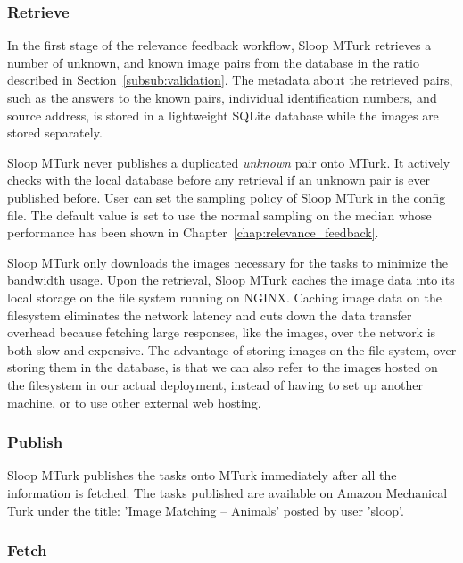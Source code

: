 \subsubsection{Retrieve}

In the first stage of the relevance feedback workflow, Sloop MTurk retrieves a
number of unknown, and known image pairs from the database in the ratio
described in Section~\ref{subsub:validation}. The metadata about the retrieved pairs,
such as the answers to the known pairs, individual identification numbers, and
source address, is stored in a lightweight SQLite database while the images are
stored separately.

Sloop MTurk never publishes a duplicated \emph{unknown} pair onto MTurk. It
actively checks with the local database before any retrieval if an unknown pair
is ever published before. User can set the sampling policy of Sloop MTurk in
the config file. The default value is set to use the normal sampling on the
median whose performance has been shown in
Chapter~\ref{chap:relevance_feedback}.

Sloop MTurk only downloads the images necessary for the tasks to minimize the
bandwidth usage. Upon the retrieval, Sloop MTurk caches the image data into its
local storage on the file system running on NGINX. Caching image data on the
filesystem eliminates the network latency and cuts down the data transfer
overhead because fetching large responses, like the images, over the network is
both slow and expensive. The advantage of storing images on the file system,
over storing them in the database, is that we can also refer to the images
hosted on the filesystem in our actual deployment, instead of having to set up
another machine, or to use other external web hosting.

\subsubsection{Publish}

Sloop MTurk publishes the tasks onto MTurk immediately after all the
information is fetched. The tasks published are available on Amazon Mechanical
Turk under the title: 'Image Matching -- Animals' posted by user 'sloop'.

\subsubsection{Fetch}

